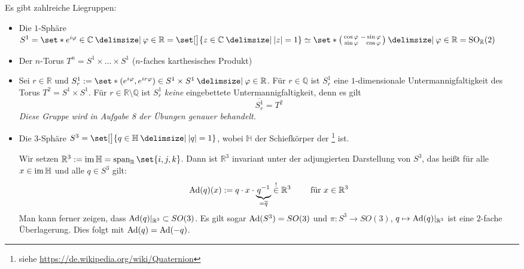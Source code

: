 \begin{beispiel*}[{name=[{Liegruppen}]}]
	Es gibt zahlreiche Liegruppen: 
	\begin{itemize}
		\item Die $1$-Sphäre $S^1 = \set*{e^{i \varphi} \in \mathbb{C} \given \varphi \in \mathbb{R}} = \set[\big]{z \in \mathbb{C} \given \abs*{z}=1} \simeq \set*{\begin{psmallmatrix*}[r]
			\cos \varphi & - \sin \varphi \\
			\sin \varphi & \cos \varphi
		\end{psmallmatrix*} \given \varphi \in \mathbb{R}} = \SO_\mathbb{R}(2)$
		\item Der $n$-Torus $T^n = S^1 \times \ldots \times S^1 $ ($n$-faches karthesisches Produkt)
		\item Sei $r \in \mathbb{R}$ und $S^1_r := \set*{\enbrace{e^{i \varphi}, e^{i r \varphi}} \in S^1 \times S^1 \given \varphi \in \mathbb{R}}$.
		Für $r \in \mathbb{Q}$ ist $S^1_r$ eine $1$-dimensionale Untermannigfaltigkeit des Torus $T^2= S^1 \times S^1$.
		Für $r \in \mathbb{R} \setminus \mathbb{Q}$ ist $S^1_r$ \emph{keine} eingebettete Untermannigfaltigkeit, denn es gilt 
		\[
			\overline{S^1_r} = T^2
		\]
		\emph{Diese Gruppe wird in Aufgabe 8 der Übungen genauer behandelt.}
		\item Die $3$-Sphäre $S^3 = \set[\big]{q \in \mathbb{H} \given \abs*{q}=1}$, wobei $\mathbb{H}$ der Schiefkörper der \footnote{siehe \url{https://de.wikipedia.org/wiki/Quaternion}} ist.
	
		Wir setzen $\mathbb{R}^3 := \im \mathbb{H} = \Span_\mathbb{R} \set{i,j,k}$.
		Dann ist $\mathbb{R}^3$ invariant unter der adjungierten Darstellung von $S^3$, das heißt für alle $x \in \operatorname{im} \mathbb{H}$ und alle $q \in S^3$ gilt:
		\[
			\operatorname{Ad}(q)(x) := q \cdot x \cdot {\underbrace{q^{-1}}_{=\overline{q}}} \stackrel{!}{\in} \mathbb{R}^3 \qquad \text{ für } x \in \mathbb{R}^3 
		\]
		Man kann ferner zeigen, dass $\operatorname{Ad}(q)|_{\mathbb{R}^3} \subset SO(3)$.
		Es gilt sogar $\operatorname{Ad}(S^3) = SO(3)$ und $\pi \colon S^3 \to SO(3)$, $q \mapsto \operatorname{Ad}(q)|_{\mathbb{R}^3}$ ist eine $2$-fache Überlagerung.
		Dies folgt mit $\operatorname{Ad}(q)=\operatorname{Ad}(-q)$.
		

\end{itemize}
\end{beispiel*}
